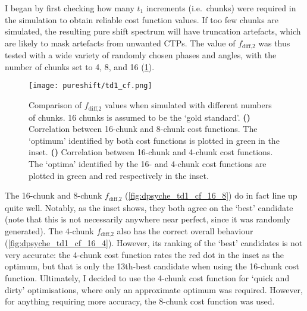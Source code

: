 I began by first checking how many $t_1$ increments (i.e.\ chunks) were required in the simulation to obtain reliable cost function values.
If too few chunks are simulated, the resulting pure shift spectrum will have truncation artefacts, which are likely to mask artefacts from unwanted CTPs.
The value of $f_\text{diff,2}$ was thus tested with a wide variety of randomly chosen phases and angles, with the number of chunks set to 4, 8, and 16 (\cref{fig:dpsyche_td1_cf}).

\begin{figure}[htb]
    \centering
    \texttt{[image: pureshift/td1\_cf.png]}
    {\label{fig:dpsyche_td1_cf_16_8}}
    {\label{fig:dpsyche_td1_cf_16_4}}
    \caption[Comparison of $f_\text{diff,2}$ cost function with different numbers of chunks]{
        Comparison of $f_\text{diff,2}$ values when simulated with different numbers of chunks.
        16 chunks is assumed to be the `gold standard'.
        \textbf{()} Correlation between 16-chunk and 8-chunk cost functions.
        The `optimum' identified by both cost functions is plotted in green in the inset.
        \textbf{()} Correlation between 16-chunk and 4-chunk cost functions.
        The `optima' identified by the 16- and 4-chunk cost functions are plotted in green and red respectively in the inset.
    }
    \label{fig:dpsyche_td1_cf}
\end{figure}

The 16-chunk and 8-chunk $f_\text{diff,2}$ (\cref{fig:dpsyche_td1_cf_16_8}) do in fact line up quite well.
Notably, as the inset shows, they both agree on the `best' candidate (note that this is not necessarily anywhere near perfect, since it was randomly generated).
The 4-chunk $f_\text{diff,2}$ also has the correct overall behaviour (\cref{fig:dpsyche_td1_cf_16_4}).
However, its ranking of the `best' candidates is not very accurate: the 4-chunk cost function rates the red dot in the inset as the optimum, but that is only the 13th-best candidate when using the 16-chunk cost function.
Ultimately, I decided to use the 4-chunk cost function for `quick and dirty' optimisations, where only an approximate optimum was required.
However, for anything requiring more accuracy, the 8-chunk cost function was used.

